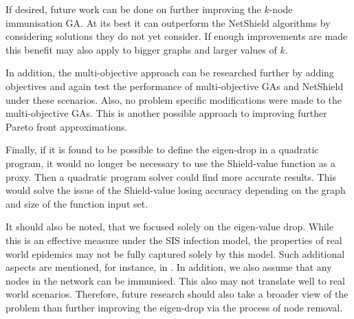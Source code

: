 \documentclass[11pt]{article}
\theoremstyle{definition}
\begin{document}
If desired, future work can be done on further improving the $k$-node immunisation GA. At its best it can outperform the NetShield algorithms by considering solutions they do not yet consider. If enough improvements are made this benefit may also apply to bigger graphs and larger values of $k$.

In addition, the multi-objective approach can be researched further by adding  objectives and again test the performance of multi-objective GAs and NetShield under these scenarios. Also, no problem specific modifications were made to the multi-objective GAs. This is another possible approach to improving further Pareto front approximations.

Finally, if it is found to be possible to define the eigen-drop in a quadratic program, it would no longer be necessary to use the Shield-value function as a proxy. Then a quadratic program solver could find more accurate results. This would solve the issue of the Shield-value losing accuracy depending on the graph and size of the function input set.

It should also be noted, that we focused solely on the eigen-value drop. While this is an effective measure under the SIS infection model, the properties of real world epidemics may not be fully captured solely by this model. Such additional aspects are mentioned, for instance, in \cite{plaat}. In addition, we also assume that any nodes in the network can be immunised. This also may not translate well to real world scenarios. Therefore, future research should also take a broader view of the problem than further improving the eigen-drop via the process of node removal.

\cleardoublepage







\cleardoublepage
\end{document}
